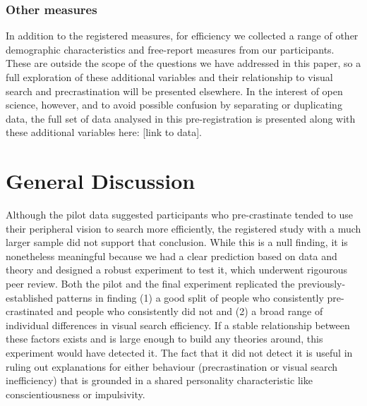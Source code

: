 \documentclass[]{rsos}
\begin{document}
\subsubsection{Other measures}

In addition to the registered measures, for efficiency we collected a range of other demographic characteristics and free-report measures from our participants. These are outside the scope of the questions we have addressed in this paper, so a full exploration of these additional variables and their relationship to visual search and precrastination will be presented elsewhere. In the interest of open science, however, and to avoid possible confusion by separating or duplicating data, the full set of data analysed in this pre-registration is presented along with these additional variables here: [link to data].

\section{General Discussion}
Although the pilot data suggested participants who pre-crastinate tended to use their peripheral vision to search more efficiently, the registered study with a much larger sample did not support that conclusion. While this is a null finding, it is nonetheless meaningful because we had a clear prediction based on data and theory and designed a robust experiment to test it, which underwent rigourous peer review. Both the pilot and the final experiment replicated the previously-established patterns in finding (1) a good split of people who consistently pre-crastinated and people who consistently did not and (2) a broad range of individual differences in visual search efficiency. If a stable relationship between these factors exists and is large enough to build any theories around, this experiment would have detected it. The fact that it did not detect it is useful in ruling out explanations for either behaviour (precrastination or visual search inefficiency) that is grounded in a shared personality characteristic like conscientiousness or impulsivity. 
\end{document}
